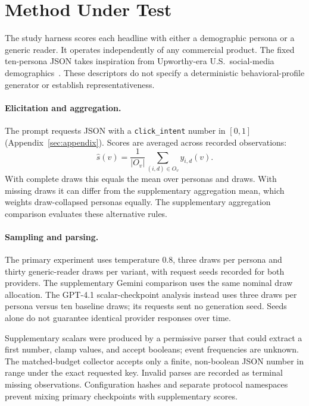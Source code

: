 \section{Method Under Test}
The study harness scores each headline with either a demographic persona or a generic reader.
It operates independently of any commercial product. The fixed ten-persona JSON takes inspiration
from Upworthy-era U.S.\ social-media demographics~\citep{holcomb2013newsuse}. These descriptors
do not specify a deterministic behavioral-profile generator or establish representativeness.

\paragraph{Elicitation and aggregation.}
The prompt requests JSON with a \texttt{click\_intent} number in $[0,1]$
(Appendix~\ref{sec:appendix}). Scores are averaged across recorded observations:
\[
\widehat{s}(v)=\frac{1}{|O_v|}\sum_{(i,d)\in O_v}y_{i,d}(v).
\]
With complete draws this equals the mean over personas and draws. With missing draws it can
differ from the supplementary aggregation mean, which weights draw-collapsed personas equally. The supplementary aggregation comparison evaluates these alternative rules.

\paragraph{Sampling and parsing.}
The primary experiment uses temperature $0.8$, three draws per persona and thirty generic-reader
draws per variant, with request seeds recorded for both providers. The supplementary Gemini
comparison uses the same nominal draw allocation. The GPT-4.1 scalar-checkpoint analysis instead
uses three draws per persona versus ten baseline draws; its requests sent no generation seed. Seeds alone do not guarantee identical
provider responses over time.

Supplementary scalars were produced by a permissive parser that could extract a first number,
clamp values, and accept booleans; event frequencies are unknown. The matched-budget collector
accepts only a finite, non-boolean JSON number in range under the exact requested key. Invalid
parses are recorded as terminal missing observations. Configuration hashes and separate protocol
namespaces prevent mixing primary checkpoints with supplementary scores.
